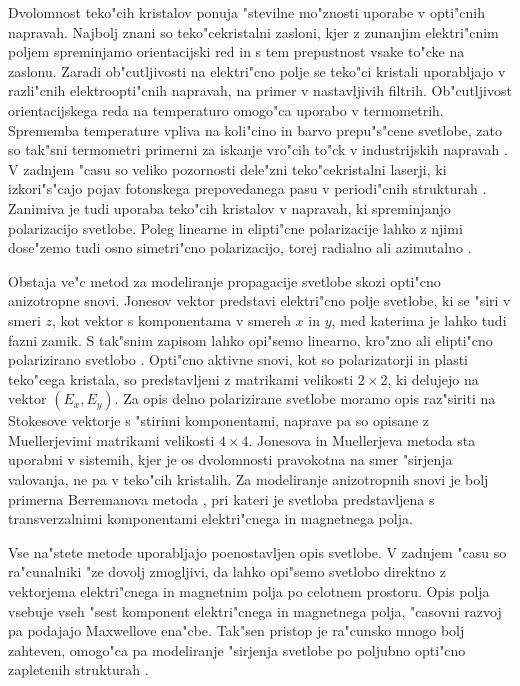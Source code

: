 \documentclass[12pt,twoside,openright,final]{report}
\begin{document}
Dvolomnost teko"cih kristalov ponuja "stevilne mo"znosti uporabe v opti"cnih napravah. 
Najbolj znani so teko"cekristalni zasloni, kjer z zunanjim elektri"cnim poljem spreminjamo orientacijski red in s tem prepustnost vsake to"cke na zaslonu. 
Zaradi ob"cutljivosti na elektri"cno polje se teko"ci kristali uporabljajo v razli"cnih elektroopti"cnih napravah, na primer v nastavljivih filtrih. 
Ob"cutljivost orientacijskega reda na temperaturo omogo"ca uporabo v termometrih. 
Sprememba temperature vpliva na koli"cino in barvo prepu"s"cene svetlobe, zato so tak"sni termometri primerni za iskanje vro"cih to"ck v industrijskih napravah \cite{hot-spots}. 
V zadnjem "casu so veliko pozornosti dele"zni teko"cekristalni laserji, ki izkori"s"cajo pojav fotonskega prepovedanega pasu v periodi"cnih strukturah \cite{humar-musevic,coles-morris}. 
Zanimiva je tudi uporaba teko"cih kristalov v napravah, ki spreminjanjo polarizacijo svetlobe. 
Poleg linearne in elipti"cne polarizacije lahko z njimi dose"zemo tudi osno simetri"cno polarizacijo, torej radialno ali azimutalno \cite{polarization-converters-linear,polarization-converters-axial}. 

Obstaja ve"c metod za modeliranje propagacije svetlobe skozi opti"cno anizotropne snovi. 
Jonesov vektor predstavi elektri"cno polje svetlobe, ki se "siri v smeri $z$, kot vektor s komponentama v smereh $x$ in $y$, med katerima je lahko tudi fazni zamik. 
S tak"snim zapisom lahko opi"semo linearno, kro"zno ali elipti"cno polarizirano svetlobo \cite{optics-lcd}. 
Opti"cno aktivne snovi, kot so polarizatorji in plasti teko"cega kristala, so predstavljeni z matrikami velikosti $2\times 2$, ki delujejo na vektor $(E_x, E_y)$. 
Za opis delno polarizirane svetlobe moramo opis raz"siriti na Stokesove vektorje s "stirimi komponentami, naprave pa so opisane z Muellerjevimi matrikami velikosti $4\times 4$.
Jonesova in Muellerjeva metoda sta uporabni v sistemih, kjer je os dvolomnosti pravokotna na smer "sirjenja valovanja, ne pa v teko"cih kristalih. 
Za modeliranje anizotropnih snovi je bolj primerna Berremanova metoda \cite{berreman,stallinga-berreman}, pri kateri je svetloba predstavljena s transverzalnimi komponentami elektri"cnega in magnetnega polja. 

Vse na"stete metode uporabljajo poenostavljen opis svetlobe. 
V zadnjem "casu so ra"cunalniki "ze dovolj zmogljivi, da lahko opi"semo svetlobo direktno z vektorjema elektri"cnega in magnetnim polja po celotnem prostoru. 
Opis polja vsebuje vseh "sest komponent elektri"cnega in magnetnega polja, "casovni razvoj pa podajajo Maxwellove ena"cbe. 
Tak"sen pristop je ra"cunsko mnogo bolj zahteven, omogo"ca pa modeliranje "sirjenja svetlobe po poljubno opti"cno zapletenih strukturah \cite{taflove, hwang-rey}. 
\end{document}
